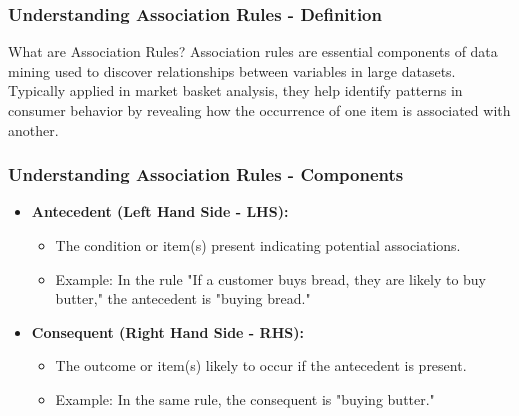 \documentclass[aspectratio=169]{beamer}
\begin{document}
\begin{frame}[fragile]
    \frametitle{Understanding Association Rules - Definition}
    \begin{block}{What are Association Rules?}
        Association rules are essential components of data mining used to discover relationships between variables in large datasets.
        Typically applied in market basket analysis, they help identify patterns in consumer behavior by revealing how the occurrence of one item is associated with another.
    \end{block}
\end{frame}

\begin{frame}[fragile]
    \frametitle{Understanding Association Rules - Components}
    \begin{itemize}
        \item \textbf{Antecedent (Left Hand Side - LHS):} 
        \begin{itemize}
            \item The condition or item(s) present indicating potential associations. 
            \item Example: In the rule "If a customer buys bread, they are likely to buy butter," the antecedent is "buying bread."
        \end{itemize}

        \item \textbf{Consequent (Right Hand Side - RHS):} 
        \begin{itemize}
            \item The outcome or item(s) likely to occur if the antecedent is present. 
            \item Example: In the same rule, the consequent is "buying butter."
        \end{itemize}
    \end{itemize}
\end{frame}
\end{document}
